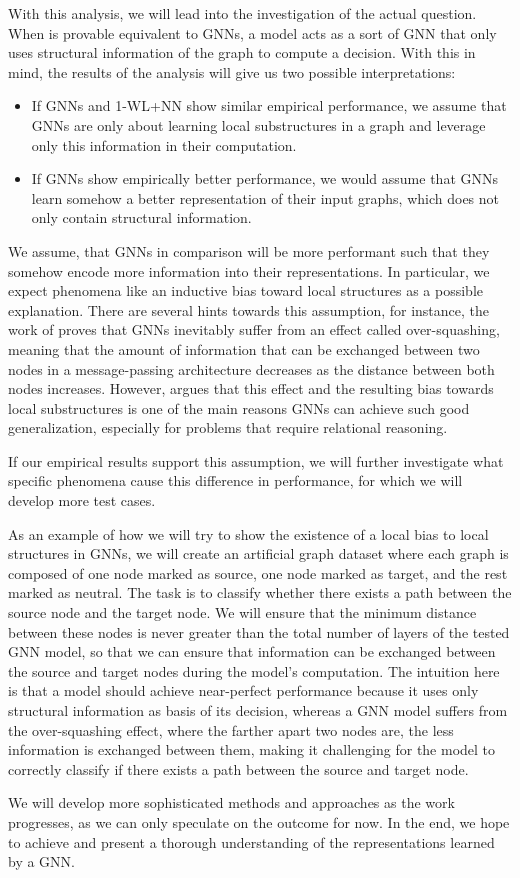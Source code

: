 \documentclass[11pt, dvipsnames, DIV=12]{scrreprt}
\theoremstyle{definition}
\newcommand{\wlnn}{\text{1-WL+NN }}
\begin{document}
With this analysis, we will lead into the investigation of the actual question. When \wlnn is provable equivalent to GNNs, a \wlnn model acts as a sort of GNN that only uses structural information of the graph to compute a decision. With this in mind, the results of the analysis will give us two possible interpretations:
\begin{itemize}
    \item If GNNs and 1-WL+NN show similar empirical performance, we assume that GNNs are only about learning local substructures in a graph and leverage only this information in their computation.
    \item If GNNs show empirically better performance, we would assume that GNNs learn somehow a better representation of their input graphs, which does not only contain structural information.
\end{itemize}
We assume, that GNNs in comparison will be more performant such that they somehow encode more information into their representations. In particular, we expect phenomena like an inductive bias toward local structures as a possible explanation. There are several hints towards this assumption, for instance, the work of \cite{Giovanni2023} proves that GNNs inevitably suffer from an effect called over-squashing, meaning that the amount of information that can be exchanged between two nodes in a message-passing architecture decreases as the distance between both nodes increases. However, \cite{Vignac2020} argues that this effect and the resulting bias towards local substructures is one of the main reasons GNNs can achieve such good generalization, especially for problems that require relational reasoning.

If our empirical results support this assumption, we will further investigate what specific phenomena cause this difference in performance, for which we will develop more test cases. 

As an example of how we will try to show the existence of a local bias to local structures in GNNs, we will create an artificial graph dataset where each graph is composed of one node marked as source, one node marked as target, and the rest marked as neutral. The task is to classify whether there exists a path between the source node and the target node. We will ensure that the minimum distance between these nodes is never greater than the total number of layers of the tested GNN model, so that we can ensure that information can be exchanged between the source and target nodes during the model's computation. The intuition here is that a \wlnn model should achieve near-perfect performance because it uses only structural information as basis of its decision, whereas a GNN model suffers from the over-squashing effect, where the farther apart two nodes are, the less information is exchanged between them, making it challenging for the model to correctly classify if there exists a path between the source and target node.

We will develop more sophisticated methods and approaches as the work progresses, as we can only speculate on the outcome for now. In the end, we hope to achieve and present a thorough understanding of the representations learned by a GNN.


\end{document}
